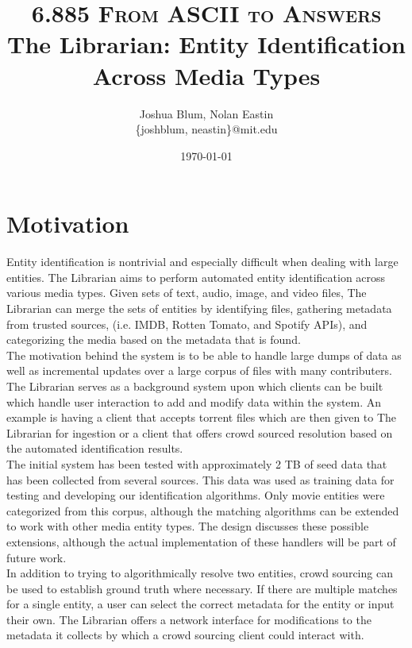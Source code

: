 \documentclass[paper=a4, fontsize=11pt]{scrartcl} %
\title{ 
\normalfont \normalsize 
\textsc{6.885 From ASCII to Answers} %
\horrule{0.5pt} %
\large The Librarian: Entity Identification Across Media Types %
\horrule{1pt} %
}
\author{Joshua Blum, Nolan Eastin \\ \{joshblum, neastin\}@mit.edu}
\date{\normalsize\today} %
\numberwithin{equation}{section} %
\numberwithin{figure}{section} %
\numberwithin{table}{section} %
\begin{document}
\maketitle %

\section{Motivation}
Entity identification is nontrivial and especially difficult when dealing with large entities. The Librarian aims to perform automated entity identification across various media types. Given sets of text, audio, image, and video files, The Librarian can merge the sets of entities by identifying files, gathering metadata from trusted sources, (i.e. IMDB, Rotten Tomato, and Spotify APIs), and categorizing the media based on the metadata that is found. \\

The motivation behind the system is to be able to handle large dumps of data as well as incremental updates over a large corpus of files with many contributers. The Librarian serves as a background system upon which clients can be built which handle user interaction to add and modify data within the system. An example is having a client that accepts torrent files which are then given to The Librarian for ingestion or a client that offers crowd sourced resolution based on the automated identification results.\\

The initial system has been tested with approximately 2 TB of seed data that has been collected from several sources. This data was used as training data for testing and developing our identification algorithms. Only movie entities were categorized from this corpus, although the matching algorithms can be extended to work with other media entity types. The design discusses these possible extensions, although the actual implementation of these handlers will be part of future work.\\

In addition to trying to algorithmically resolve two entities, crowd sourcing can be used to establish ground truth where necessary. If there are multiple matches for a single entity, a user can select the correct metadata for the entity or input their own. The Librarian offers a network interface for modifications to the metadata it collects by which a crowd sourcing client could interact with.\\
\end{document}
